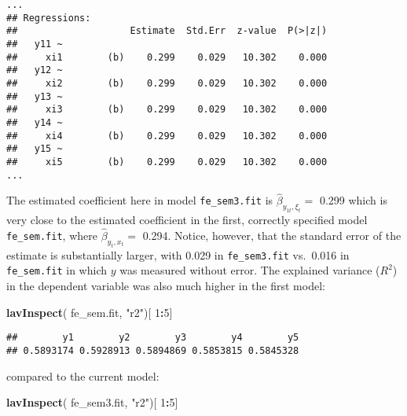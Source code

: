 \documentclass[]{interact}
\theoremstyle{plain}%
\theoremstyle{definition}
\theoremstyle{remark}
\newenvironment{Shaded}{\begin{snugshade}}{\end{snugshade}}
\newcommand{\DecValTok}[1]{\textcolor[rgb]{0.00,0.00,0.81}{#1}}
\newcommand{\KeywordTok}[1]{\textcolor[rgb]{0.13,0.29,0.53}{\textbf{#1}}}
\newcommand{\NormalTok}[1]{#1}
\newcommand{\OperatorTok}[1]{\textcolor[rgb]{0.81,0.36,0.00}{\textbf{#1}}}
\newcommand{\StringTok}[1]{\textcolor[rgb]{0.31,0.60,0.02}{#1}}
\begin{document}
\begin{verbatim}
...
## Regressions:
##                    Estimate  Std.Err  z-value  P(>|z|)
##   y11 ~                                               
##     xi1        (b)    0.299    0.029   10.302    0.000
##   y12 ~                                               
##     xi2        (b)    0.299    0.029   10.302    0.000
##   y13 ~                                               
##     xi3        (b)    0.299    0.029   10.302    0.000
##   y14 ~                                               
##     xi4        (b)    0.299    0.029   10.302    0.000
##   y15 ~                                               
##     xi5        (b)    0.299    0.029   10.302    0.000
...
\end{verbatim}

\doublespacing

The estimated coefficient here in model \texttt{fe\_sem3.fit} is
\(\hat{\beta}_{y_{1t},\xi_{t}} =\) 0.299 which is very close to the
estimated coefficient in the first, correctly specified model
\texttt{fe\_sem.fit}, where \(\hat{\beta}_{y_{t},x_{t}} =\) 0.294.
Notice, however, that the standard error of the estimate is
substantially larger, with 0.029 in \texttt{fe\_sem3.fit} vs.~0.016 in
\texttt{fe\_sem.fit} in which \(y\) was measured without error. The
explained variance (\(R^{2}\)) in the dependent variable was also much
higher in the first model:

\singlespacing

\begin{Shaded}
\begin{Highlighting}[]
\KeywordTok{lavInspect}\NormalTok{( fe\_sem.fit, }\StringTok{"r2"}\NormalTok{)[ }\DecValTok{1}\OperatorTok{:}\DecValTok{5}\NormalTok{]}
\end{Highlighting}
\end{Shaded}

\begin{verbatim}
##        y1        y2        y3        y4        y5 
## 0.5893174 0.5928913 0.5894869 0.5853815 0.5845328
\end{verbatim}

\doublespacing

compared to the current model:

\singlespacing

\begin{Shaded}
\begin{Highlighting}[]
\KeywordTok{lavInspect}\NormalTok{( fe\_sem3.fit, }\StringTok{"r2"}\NormalTok{)[ }\DecValTok{1}\OperatorTok{:}\DecValTok{5}\NormalTok{]}
\end{Highlighting}
\end{Shaded}
\end{document}
